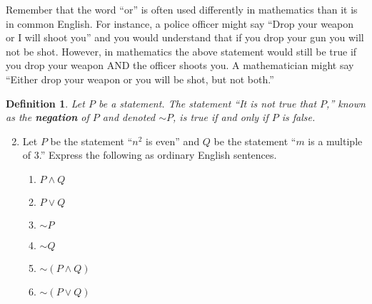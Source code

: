 \documentclass[12 pt]{article}
\theoremstyle{definition}
\theoremstyle{plain}
\theoremstyle{mytheorem}
\theoremstyle{myexample}
\theoremstyle{mydefinition}
\newtheorem{definition}{Definition}
\begin{document}
Remember that the word ``or'' is often used differently in mathematics than it is in common English.  For instance, a police officer might say ``Drop your weapon or I will shoot you'' and you would understand that if you drop your gun you will not be shot.  However, in mathematics the above statement would still be true if you drop your weapon AND the officer shoots you.  A mathematician might say ``Either drop your weapon or you will be shot, but not both.''

\begin{definition}  Let $P$ be a statement.  The statement ``It is not true that $P$,'' known as the \textbf{negation} of $P$ and denoted $\sim\!P$, is true if and only if $P$ is false.  
\end{definition}

\begin{enumerate}\setcounter{enumi}{1} \item Let $P$ be the statement ``$n^2$ is even'' and $Q$ be the statement ``$m$ is a multiple of 3.''  Express the following as ordinary English sentences.
	\begin{enumerate}
	\item $P \wedge Q$
	
	\vspace{.75in}
	
	\item $P \vee Q$
	
	\vspace{.75in}
	
	\item $\sim\!P$
	
	\vspace{.75in}
	
	\item $\sim\!Q$
	
	\vspace{.75in}
	
	\item $ \sim\!(P \wedge Q)$
	
	\vspace{.75in}
	
	\item $ \sim\!(P \vee Q)$
	
	\vspace{.75in}
	
	\end{enumerate}
\end{enumerate}
\end{document}
